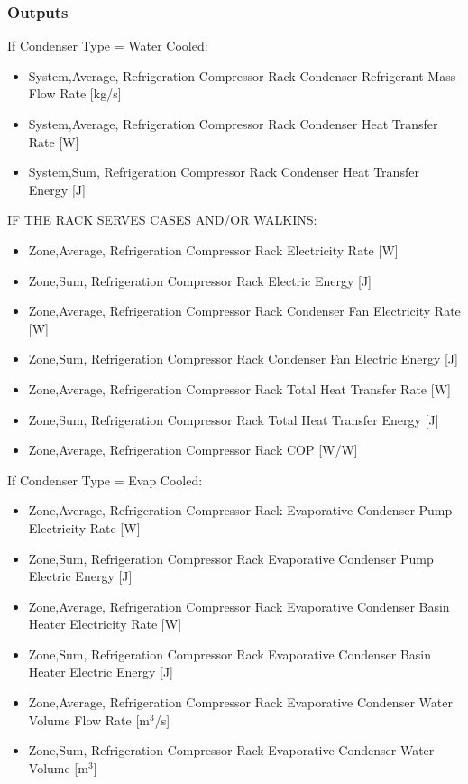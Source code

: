\subsubsection{Outputs}\label{outputs-028}

If Condenser Type = Water Cooled:

\begin{itemize}
\item
  System,Average, Refrigeration Compressor Rack Condenser Refrigerant Mass Flow Rate {[}kg/s{]}
\item
  System,Average, Refrigeration Compressor Rack Condenser Heat Transfer Rate {[}W{]}
\item
  System,Sum, Refrigeration Compressor Rack Condenser Heat Transfer Energy {[}J{]}
\end{itemize}

IF THE RACK SERVES CASES AND/OR WALKINS:

\begin{itemize}
\item
  Zone,Average, Refrigeration Compressor Rack Electricity Rate {[}W{]}
\item
  Zone,Sum, Refrigeration Compressor Rack Electric Energy {[}J{]}
\item
  Zone,Average, Refrigeration Compressor Rack Condenser Fan Electricity Rate {[}W{]}
\item
  Zone,Sum, Refrigeration Compressor Rack Condenser Fan Electric Energy {[}J{]}
\item
  Zone,Average, Refrigeration Compressor Rack Total Heat Transfer Rate {[}W{]}
\item
  Zone,Sum, Refrigeration Compressor Rack Total Heat Transfer Energy {[}J{]}
\item
  Zone,Average, Refrigeration Compressor Rack COP {[}W/W{]}
\end{itemize}

If Condenser Type = Evap Cooled:

\begin{itemize}
\item
  Zone,Average, Refrigeration Compressor Rack Evaporative Condenser Pump Electricity Rate {[}W{]}
\item
  Zone,Sum, Refrigeration Compressor Rack Evaporative Condenser Pump Electric Energy {[}J{]}
\item
  Zone,Average, Refrigeration Compressor Rack Evaporative Condenser Basin Heater Electricity Rate {[}W{]}
\item
  Zone,Sum, Refrigeration Compressor Rack Evaporative Condenser Basin Heater Electric Energy {[}J{]}
\item
  Zone,Average, Refrigeration Compressor Rack Evaporative Condenser Water Volume Flow Rate {[}m\(^{3}\)/s{]}
\item
  Zone,Sum, Refrigeration Compressor Rack Evaporative Condenser Water Volume {[}m\(^{3}\){]}
\end{itemize}

